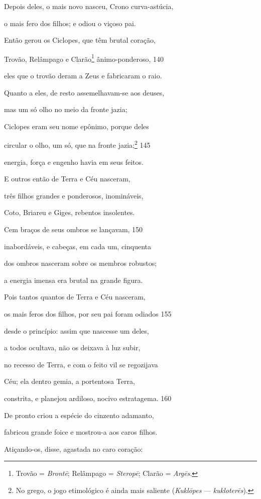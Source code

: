 Depois deles, o mais novo nasceu, Crono curva-astúcia,

o mais fero dos filhos; e odiou o viçoso pai.

\quad{}Então gerou os Ciclopes, que têm brutal coração,

Trovão, Relâmpago e Clarão\footnote{Trovão = \emph{Brontē}; Relâmpago = \emph{Steropē}; Clarão = \emph{Argēs}.} ânimo-ponderoso, \num{140}

eles que o trovão deram a Zeus e fabricaram o raio.

Quanto a eles, de resto assemelhavam-se aos deuses,

mas um só olho no meio da fronte jazia;

Ciclopes eram seu nome epônimo, porque deles

circular o olho, um só, que na fronte jazia;\footnote{No grego, o jogo etimológico é ainda mais saliente
(\emph{Kuklōpes} --- \emph{kukloterēs}).} \num{145}

energia, força e engenho havia em seus feitos.

\quad{}E outros então de Terra e Céu nasceram,

três filhos grandes e ponderosos, inomináveis,

Coto, Briareu e Giges, rebentos insolentes.

Cem braços de seus ombros se lançavam, \num{150}

inabordáveis, e cabeças, em cada um, cinquenta

dos ombros nasceram sobre os membros robustos;

a energia imensa era brutal na grande figura.

\quad{}Pois tantos quantos de Terra e Céu nasceram,

os mais feros dos filhos, por seu pai foram odiados \num{155}

desde o princípio: assim que nascesse um deles,

a todos ocultava, não os deixava à luz subir,

no recesso de Terra, e com o feito vil se regozijava

Céu; ela dentro gemia, a portentosa Terra,

constrita, e planejou ardiloso, nocivo estratagema. \num{160}

De pronto criou a espécie do cinzento adamanto,

fabricou grande foice e mostrou-a aos caros filhos.

\quad{}Atiçando-os, disse, agastada no caro coração:

